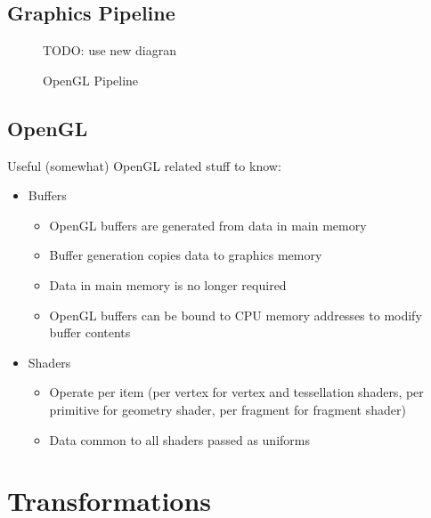\documentclass[a4paper]{article}
\begin{document}
\subsection{Graphics Pipeline}

\begin{figure}[h!]
  \centering
  TODO: use new diagran
  \caption{OpenGL Pipeline}
  \label{fig:graphics_pipeline}
\end{figure}
\FloatBarrier

\subsection{OpenGL}

Useful (somewhat) OpenGL related stuff to know:

\begin{itemize}
  \item
    Buffers
    \begin{itemize}
      \item
        OpenGL buffers are generated from data in main memory

      \item
        Buffer generation copies data to graphics memory

      \item
        Data in main memory is no longer required

      \item
        OpenGL buffers can be bound to CPU memory addresses to modify buffer
        contents

    \end{itemize}

  \item
    Shaders
    \begin{itemize}
      \item
        Operate per item (per vertex for vertex and tessellation shaders, per
        primitive for geometry shader, per fragment for fragment shader)

      \item
        Data common to all shaders passed as uniforms

    \end{itemize}
\end{itemize}

\section{Transformations}
\label{sec:transformations}
\end{document}
